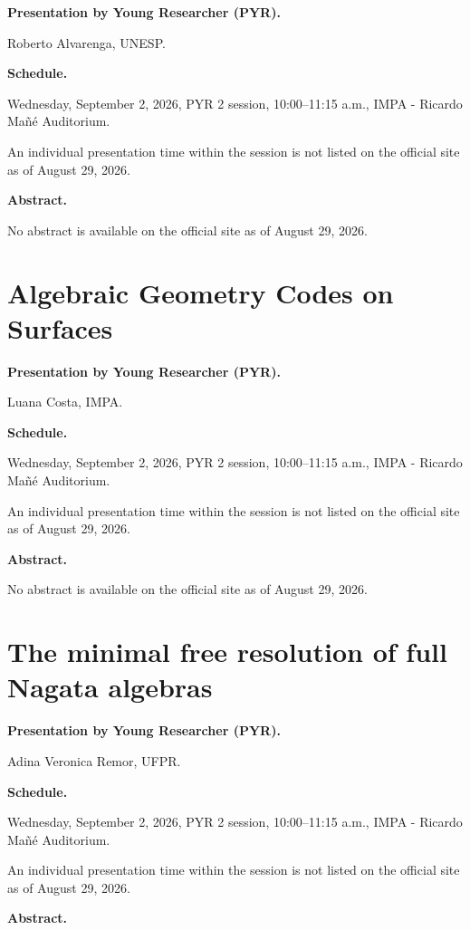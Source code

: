 \medskip\noindent
{\bf Presentation by Young Researcher
(PYR).}

Roberto Alvarenga,
UNESP.

\medskip\noindent
{\bf Schedule.}

Wednesday, September 2, 2026,
PYR 2 session, 10:00--11:15 a.m.,
IMPA - Ricardo Ma\~n\'e Auditorium.

An individual presentation time within
the session is not listed on the
official site as of August 29, 2026.

\medskip\noindent
{\bf Abstract.}

No abstract is available on the official
site as of August 29, 2026.

\section{Algebraic Geometry Codes on
Surfaces}
\label{section-algebraic-geometry-codes}

\medskip\noindent
{\bf Presentation by Young Researcher
(PYR).}

Luana Costa,
IMPA.

\medskip\noindent
{\bf Schedule.}

Wednesday, September 2, 2026,
PYR 2 session, 10:00--11:15 a.m.,
IMPA - Ricardo Ma\~n\'e Auditorium.

An individual presentation time within
the session is not listed on the
official site as of August 29, 2026.

\medskip\noindent
{\bf Abstract.}

No abstract is available on the official
site as of August 29, 2026.

\section{The minimal free resolution of
full Nagata algebras}
\label{section-minimal-resolution-nagata}

\medskip\noindent
{\bf Presentation by Young Researcher
(PYR).}

Adina Veronica Remor,
UFPR.

\medskip\noindent
{\bf Schedule.}

Wednesday, September 2, 2026,
PYR 2 session, 10:00--11:15 a.m.,
IMPA - Ricardo Ma\~n\'e Auditorium.

An individual presentation time within
the session is not listed on the
official site as of August 29, 2026.

\medskip\noindent
{\bf Abstract.}

